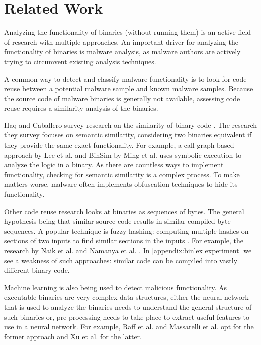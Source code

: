 \chapter{Related Work}\label{chapter:related work}
Analyzing the functionality of binaries (without running them) is an active field of research with multiple approaches. An important driver for analyzing the functionality of binaries is malware analysis, as malware authors are actively trying to circumvent existing analysis techniques.

\medskip

A common way to detect and classify malware functionality is to look for code reuse between a potential malware sample and known malware samples. Because the source code of malware binaries is generally not available, assessing code reuse requires a similarity analysis of the binaries.

Haq and Caballero survey research on the similarity of binary code \cite{similarity-binary-code}. The research they survey focuses on semantic similarity, considering two binaries equivalent if they provide the same exact functionality. For example, a call graph-based approach by Lee et al. \cite{binary-similarity-call-graph} and BinSim by Ming et al. \cite{binsim} uses symbolic execution to analyze the logic in a binary. As there are countless ways to implement functionality, checking for semantic similarity is a complex process. To make matters worse, malware often implements obfuscation techniques to hide its functionality.

Other code reuse research looks at binaries as sequences of bytes. The general hypothesis being that similar source code results in similar compiled byte sequences. A popular technique is fuzzy-hashing: computing multiple hashes on sections of two inputs to find similar sections in the inputs \cite{piecewise-hashing}. For example, the research by Naik et al. \cite{fuzzy-import-hashing} and Namanya et al. \cite{fuzzy-hashing-combinational}. In \autoref{appendix:binlex experiment} we see a weakness of such approaches: similar code can be compiled into vastly different binary code.

\medskip

Machine learning is also being used to detect malicious functionality. As executable binaries are very complex data structures, either the neural network that is used to analyze the binaries needs to understand the general structure of such binaries or, pre-processing needs to take place to extract useful features to use in a neural network. For example, Raff et al. \cite{eat-exe} and Massarelli et al. \cite{safe} opt for the former approach and Xu et al. \cite{gemini} for the latter.

